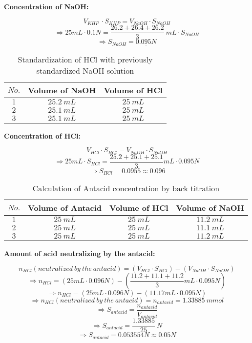 \documentclass[12pt]{article}
\begin{document}
	\textbf{Concentration of NaOH: }
	
	$$V_{KHP}\ \cdot S_{KHP} = V_{NaOH} \cdot S_{NaOH}$$
	$$\Rightarrow 25mL \cdot 0.1N = \frac{26.2+26.4+26.2}{3}\ mL \cdot S_{NaOH}$$
	$$\Rightarrow S_{NaOH} = \underline{0.095N}$$
	
		\begin{table}[H]
		\centering
		\def\arraystretch{1.5}
		\begin{tabular}{|c||c|c|}
			\hline
			$No.$&Volume of NaOH&Volume of HCl\\
			\hline
			\hline
			$1$&$25.2\ mL$&$25\ mL$\\
			\hline
			$2$&$25.1\ mL$&$25\ mL$\\
			\hline
			$3$&$25.1\ mL$&$25\ mL$\\
			\hline
		\end{tabular}
		\caption{Standardization of HCl with previously standardized NaOH solution}
		\label{tab:std_HCl}
	\end{table}

	\pagebreak

	\textbf{Concentration of HCl: }
	
	$$V_{HCl} \cdot S_{HCl} = V_{NaOH} \cdot S_{NaOH}$$
	$$\Rightarrow 25mL \cdot S_{HCl} = \frac{25.2+25.1+25.1}{3} mL \cdot 0.095N$$
	$$\Rightarrow S_{HCl} = 0.0955 \approx \underline{0.096}$$
	
	
		\begin{table}[H]
		\centering
		\def\arraystretch{1.5}
		\begin{tabular}{|c||c|c|c|}
			\hline
			$No.$&Volume of Antacid&Volume of HCl&Volume of NaOH\\
			\hline
			\hline
			$1$&$25\ mL$&$25\ mL$&$11.2\ mL$\\
			\hline
			$2$&$25\ mL$&$25\ mL$&$11.1\ mL$\\
			\hline
			$3$&$25\ mL$&$25\ mL$&$11.2\ mL$\\
			\hline
		\end{tabular}
		\caption{Calculation of Antacid concentration by back titration}
		\label{tab:back}
	\end{table}
	
	\textbf{Amount of acid neutralizing by the antacid: }
	
	$$n_{HCl} (neutralized\ by\ the\ antacid) = (V_{HCl} \cdot S_{HCl}) - (V_{NaOH} \cdot S_{NaOH})$$
	$$\Rightarrow n_{HCl} = (25mL \cdot 0.096N)-\left(\frac{11.2+11.1+11.2}{3}mL \cdot 0.095N\right)$$
	$$\Rightarrow n_{HCl} = (25mL \cdot 0.096N)-\left(11.17mL \cdot 0.095N\right)$$
	$$\Rightarrow n_{HCl}(neutralized\ by\ the\ antacid) = n_{antacid} =  1.33885\ mmol$$
	$$\Rightarrow S_{antacid} = \frac{n_{antacid}}{V_{antacid}}$$
	$$\Rightarrow S_{antacid} = \frac{1.33885}{25}\ N$$
	$$\Rightarrow S_{antacid} = 0.053554N \approx 0.05N$$
	
\end{document}
